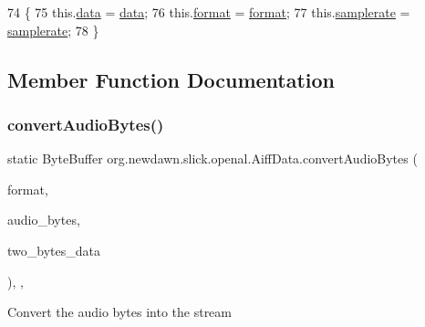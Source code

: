 \begin{DoxyCode}
74                                                                   \{
75         this.\mbox{\hyperlink{classorg_1_1newdawn_1_1slick_1_1openal_1_1_aiff_data_a02d81a81b398f83b4aed171704a37e36}{data}} = \mbox{\hyperlink{classorg_1_1newdawn_1_1slick_1_1openal_1_1_aiff_data_a02d81a81b398f83b4aed171704a37e36}{data}};
76         this.\mbox{\hyperlink{classorg_1_1newdawn_1_1slick_1_1openal_1_1_aiff_data_a54e467ab61d7d0e34cb273fd0b4b0779}{format}} = \mbox{\hyperlink{classorg_1_1newdawn_1_1slick_1_1openal_1_1_aiff_data_a54e467ab61d7d0e34cb273fd0b4b0779}{format}};
77         this.\mbox{\hyperlink{classorg_1_1newdawn_1_1slick_1_1openal_1_1_aiff_data_adef9190479e5b91bca445853c8d3de77}{samplerate}} = \mbox{\hyperlink{classorg_1_1newdawn_1_1slick_1_1openal_1_1_aiff_data_adef9190479e5b91bca445853c8d3de77}{samplerate}};
78     \}
\end{DoxyCode}


\subsection{Member Function Documentation}
\mbox{\label{classorg_1_1newdawn_1_1slick_1_1openal_1_1_aiff_data_a00be2b6b6b5817dfe4fb37eab2aac619}} 
\subsubsection{\texorpdfstring{convert\+Audio\+Bytes()}{convertAudioBytes()}}
{\footnotesize\ttfamily static Byte\+Buffer org.\+newdawn.\+slick.\+openal.\+Aiff\+Data.\+convert\+Audio\+Bytes (\begin{DoxyParamCaption}\item[{Audio\+Format}]{format,  }\item[{byte \mbox{[}$\,$\mbox{]}}]{audio\+\_\+bytes,  }\item[{boolean}]{two\+\_\+bytes\+\_\+data }\end{DoxyParamCaption})\hspace{0.3cm}{\ttfamily [inline]}, {\ttfamily [static]}, {\ttfamily [private]}}

Convert the audio bytes into the stream


